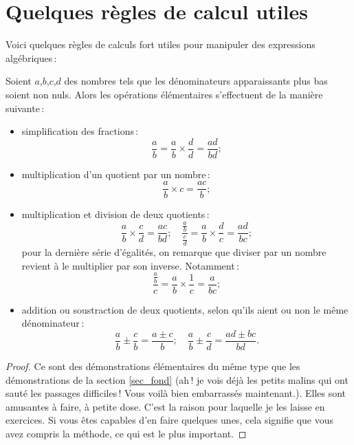 	\section{Quelques règles de calcul utiles}\label{sec_regles}
		Voici quelques règles de calculs fort utiles pour manipuler des expressions algébriques\,:
		\begin{thm}
			Soient $a$,$b$,$c$,$d$ des nombres tels que les dénominateurs apparaissants plus bas soient non nuls. Alors les opérations élémentaires s'effectuent de la manière suivante\,:
			\begin{itemize}[$\bullet$]
				\item simplification des fractions\,:
				\begin{equation}
					\frac{a}{b}=\frac{a}{b}\times\frac{d}{d}=\frac{ad}{bd};
				\end{equation}
				\item multiplication d'un quotient par un nombre\,:
				\begin{equation}
					\frac{a}{b}\times c=\frac{ac}{b};
				\end{equation}
				\item multiplication et division de deux quotients\,:
				\begin{equation}
					\frac{a}{b}\times\frac{c}{d}=\frac{ac}{bd};\quad \frac{\frac{a}{b}}{\frac{c}{d}}=\frac{a}{b}\times\frac{d}{c}=\frac{ad}{bc};
				\end{equation}
				pour la dernière série d'égalités, on remarque que diviser par un nombre revient à le multiplier par son inverse. Notamment\,:
				\begin{equation}
					\frac{\frac{a}{b}}{c}=\frac{a}{b}\times\frac{1}{c}=\frac{a}{bc};
				\end{equation}
				\item addition ou soustraction de deux quotients, selon qu'ils aient ou non le même dénominateur\,:
				\begin{equation}
					\frac{a}{b}\pm\frac{c}{b}=\frac{a\pm c}{b};\quad \frac{a}{b}\pm\frac{c}{d}=\frac{ad\pm bc}{bd}.
				\end{equation}
			\end{itemize}
		\end{thm}
		\begin{proof}
			Ce sont des démonstrations élémentaires du même type que les démonstrations de la section \ref{sec_fond} (ah\,! je vois déjà les petits malins qui ont sauté les passages difficiles\,! Vous voilà bien embarrassés maintenant.). Elles sont amusantes à faire, à petite dose. C'est la raison pour laquelle je les laisse en exercices. Si vous êtes capables d'en faire quelques unes, cela signifie que vous avez compris la méthode, ce qui est le plus important.
		\end{proof}

